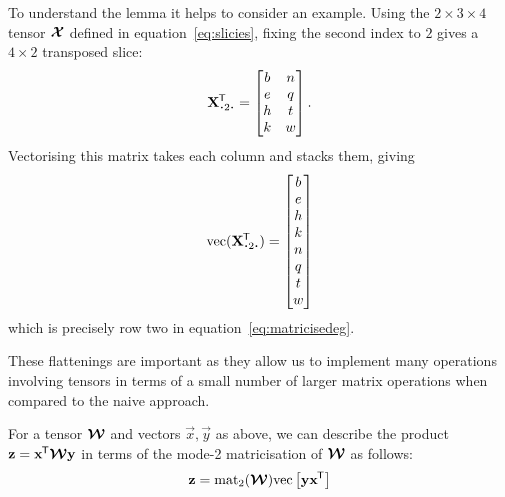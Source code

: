 To understand the lemma it helps to consider an example. Using the \(2 \times 3 \times 4\)
tensor \(\bm{\mathcal{X}}\) defined
in equation~\eqref{eq:slicies}, fixing the second index to \(2\) gives a \(4 \times 2\) 
transposed slice:
\begin{equation}\label{eq:mode2slice}
	\tran{\mat{X}_{\midbullet 2 \midbullet}} = \begin{bmatrix}
		b & n \\
		e & q \\
		h & t \\
		k & w
	\end{bmatrix}.
\end{equation} Vectorising this matrix takes each column and stacks them, giving
\begin{equation}\label{eq:veceg}
	\vect(\tran{\mat{X}_{\midbullet 2 \midbullet}}) = \begin{bmatrix}
		b \\
		e \\
		h \\
		k \\
		n \\
		q \\
		t \\
		w
	\end{bmatrix}
\end{equation} which is precisely row two in equation~\eqref{eq:matricisedeg}.

These flattenings are important as they allow us to
implement many operations involving tensors in terms of a small number of larger matrix
operations when compared to the naive approach.

\begin{lem}\label{lem:outerprod}
For a tensor \(\bm{\mathcal{W}}\) and vectors \(\vec{x}, \vec{y}\) as above,
we can describe the product \(\mathbf{z} = \mathbf{x}^{\mkern-1.5mu\mathsf{T}}\bm{\mathcal{W}}\mathbf{y}\) in terms of the
mode-2 matricisation of \(\bm{\mathcal{W}}\) as 
follows:
\begin{align}
	\mathbf{z} = \operatorname{mat}_2(\bm{\mathcal{W}})\mathrm{vec}\left[\mathbf{y}\mathbf{x}^{\mkern-1.5mu\mathsf{T}}\right]
	\label{eq:bilinearouter}
\end{align}
\end{lem}

